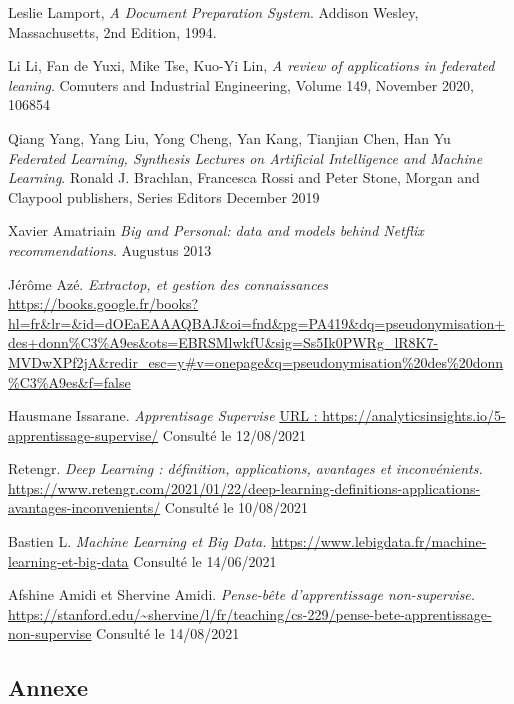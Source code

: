 \documentclass[12pt,a4paper]{report}
\begin{document}
\begin{thebibliography}{9}

	  Leslie Lamport,
	  \emph{A Document Preparation System}.
	  Addison Wesley, Massachusetts,
	  2nd Edition,
	  1994.
	  
	  Li Li, Fan de Yuxi, Mike Tse, Kuo-Yi Lin,
	  \emph{A review of applications in federated leaning}.
	  Comuters and Industrial Engineering,
	  Volume 149,
	  November 2020,
	  106854
	  
	  Qiang Yang, Yang Liu, Yong Cheng, Yan Kang, Tianjian Chen, Han Yu
	  \emph{Federated Learning, Synthesis Lectures on Artificial Intelligence and Machine Learning}.
	  Ronald J. Brachlan, Francesca Rossi and Peter Stone,
	  Morgan and Claypool publishers,
	  Series Editors
	  December 2019
	  
	  Xavier Amatriain
	  \emph{Big and Personal: data and models behind Netflix recommendations}.
	  Augustus 2013
	  
	  Jérôme Azé.
	  \emph{Extractop, et gestion des connaissances}
	  \url{https://books.google.fr/books?hl=fr&lr=&id=dOEaEAAAQBAJ&oi=fnd&pg=PA419&dq=pseudonymisation+des+donn%C3%A9es&ots=EBRSMlwkfU&sig=Ss5Ik0PWRg_lR8K7-MVDwXPf2jA&redir_esc=y#v=onepage&q=pseudonymisation%20des%20donn%C3%A9es&f=false}
	  
	  Hausmane Issarane.
	  \emph{Apprentisage Supervise}
	  \url{URL : https://analyticsinsights.io/5-apprentissage-supervise/} Consulté le 12/08/2021
		  
	  Retengr.
	  \emph{Deep Learning : définition, applications, avantages et inconvénients.}
	  \url {https://www.retengr.com/2021/01/22/deep-learning-definitions-applications-avantages-inconvenients/}
	  Consulté le 10/08/2021
	  
	Bastien L.
	\emph{Machine Learning et Big Data.}
	\url {https://www.lebigdata.fr/machine-learning-et-big-data} Consulté le 14/06/2021
	
	Afshine Amidi et Shervine Amidi.
	\emph{Pense-bête d'apprentissage non-supervise.}
	\url{https://stanford.edu/~shervine/l/fr/teaching/cs-229/pense-bete-apprentissage-non-supervise} Consulté le 14/08/2021

\end{thebibliography}



 


\begin{appendix}
\chapter{Annexe}
 
\end{appendix}
\end{document}
